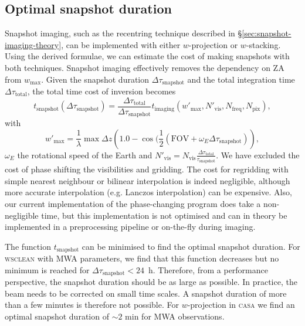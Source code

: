 \documentclass[useAMS,usenatbib]{mn2e}
\newcommand{\editmark}[1]{#1}
\begin{document}
\subsection{Optimal snapshot duration}
Snapshot imaging, such as the recentring technique described in \S\ref{sec:snapshot-imaging-theory}, can be implemented with either $w$-projection or $w$-stacking. Using the derived formulae, we can estimate the cost of making snapshots with both techniques. Snapshot imaging effectively removes the dependency on ZA from $w_{\max}$. Given the snapshot duration $\Delta \tau_\textrm{snapshot}$ and the total integration time $\Delta \tau_\textrm{total}$, the total time cost of inversion becomes
\begin{equation} \label{eq:snapshot-cost}
t_\textrm{snapshot}(\Delta \tau_\textrm{snapshot}) = \frac{\Delta \tau_\textrm{total}}{\Delta \tau_\textrm{snapshot}} t_\textrm{imaging}(w'_{\max},N'_\textrm{vis},N_\textrm{freq},N_\textrm{pix}),
\end{equation}
with
\begin{equation}
w'_{\max} = \frac{1}{\lambda}\max \Delta z \left(1.0 - \cos(\frac{1}{2}(\textrm{FOV} + \omega_E \Delta \tau_\textrm{snapshot})\right),
\end{equation}
$\omega_E$ the rotational speed of the Earth and $N'_\textrm{vis} = N_\textrm{vis}\frac{\Delta \tau_\textrm{total}}{\tau_\textrm{snapshot}}$. We have excluded the cost of phase shifting the visibilities and gridding. The cost for regridding with simple nearest neighbour or bilinear interpolation is indeed negligible, although more accurate interpolation (e.g. Lanczos interpolation) can be expensive. Also, our current implementation of the phase-changing program does take a non-negligible time, but this implementation is not optimised and can in theory be implemented in a preprocessing pipeline or on-the-fly during imaging.

The function $t_\textrm{snapshot}$ can be minimised to find the optimal snapshot duration. For \textsc{wsclean} with MWA parameters, we find that this function decreases but no minimum is reached for $\Delta \tau_\textrm{snapshot}<24$~h. Therefore, from a performance perspective, the snapshot duration should be as large as possible. In \editmark{practice}, the beam needs to be corrected on small time scales. A snapshot duration of more than a few minutes is therefore not possible. For $w$-projection in \textsc{casa} we find an optimal snapshot duration of $\sim2$ min for MWA observations.
\end{document}
